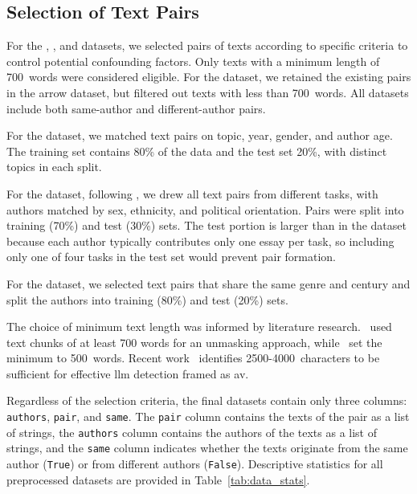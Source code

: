 \subsection{Selection of Text Pairs}
\label{subsec:dataset_text_pair_selection}

For the \dataBlog{}, \dataStudent{}, and \dataGutenberg{} datasets, we selected pairs of texts according to specific criteria to control potential confounding factors.
Only texts with a minimum length of \num{700}~words were considered eligible. 
For the \dataPan{} dataset, we retained the existing pairs in the arrow dataset, but filtered out texts with less than \num{700}~words. 
All datasets include both same-author and different-author pairs. 

For the \dataBlog{} dataset, we matched text pairs on topic, year, gender, and author age. The training set contains 80\% of the data and the test set 20\%, with distinct topics in each split.

For the \dataStudent{} dataset, following \citet{koppel_determining_2014}, we drew all text pairs from different tasks, with authors matched by sex, ethnicity, and political orientation. Pairs were split into training (70\%) and test (30\%) sets.
The test portion is larger than in the \dataBlog{} dataset because each author typically contributes only one essay per task, so including only one of four tasks in the test set would prevent pair formation.

For the \dataGutenberg{} dataset, we selected text pairs that share the same genre and century and split the authors into training (80\%) and test (20\%) sets.

The choice of minimum text length was informed by literature research.
\citet{bevendorff_generalizing_2019}\ used text chunks of at least 700 words for an unmasking approach, while \citet{koppel_authorship_2004}\ set the minimum to \num{500}~words.
Recent work~\citep{llm_detection_av_2025} identifies \num{2500}-\num{4000}~characters to be sufficient for effective \ac{llm} detection framed as \ac{av}.

Regardless of the selection criteria, the final datasets contain only three columns: \texttt{authors}, \texttt{pair}, and \texttt{same}.
The \texttt{pair} column contains the texts of the pair as a list of strings,
the \texttt{authors} column contains the authors of the texts as a list of strings,
and the \texttt{same} column indicates whether the texts originate from the same author (\texttt{True}) or from different authors (\texttt{False}).
Descriptive statistics for all preprocessed datasets are provided in Table~\ref{tab:data_stats}.

